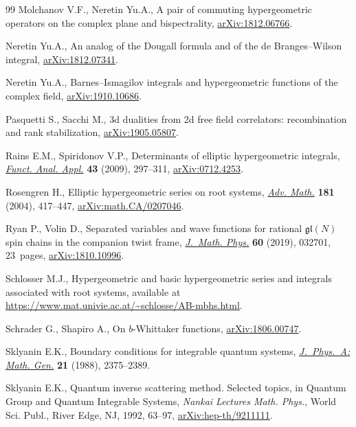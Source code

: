 \documentclass[pdftex]{sigma}
\numberwithin{equation}{section}
\begin{document}
\begin{thebibliography}{99}
Molchanov V.F., Neretin Yu.A., A pair of commuting hypergeometric operators on
 the complex plane and bispectrality, \href{https://arxiv.org/abs/1812.06766}{arXiv:1812.06766}.

Neretin Yu.A., An analog of the {D}ougall formula and of the de
 {B}ranges--{W}ilson integral, \href{https://arxiv.org/abs/1812.07341}{arXiv:1812.07341}.

Neretin Yu.A., Barnes--{I}smagilov integrals and hypergeometric functions of the
 complex field, \href{https://arxiv.org/abs/1910.10686}{arXiv:1910.10686}.

Pasquetti S., Sacchi M., 3d dualities from 2d free field correlators:
 recombination and rank stabilization, \href{https://arxiv.org/abs/1905.05807}{arXiv:1905.05807}.

Rains E.M., Spiridonov V.P., Determinants of elliptic hypergeometric integrals,
 \href{https://doi.org/10.1007/s10688-009-0037-7}{\textit{Funct. Anal. Appl.}} \textbf{43} (2009), 297--311, \href{https://arxiv.org/abs/0712.4253}{arXiv:0712.4253}.

Rosengren H., Elliptic hypergeometric series on root systems, \href{https://doi.org/10.1016/S0001-8708(03)00071-9}{\textit{Adv.
 Math.}} \textbf{181} (2004), 417--447, \href{https://arxiv.org/abs/math.CA/0207046}{arXiv:math.CA/0207046}.

Ryan P., Volin D., Separated variables and wave functions for rational
 {$\mathfrak{gl}(N)$} spin chains in the companion twist frame,
 \href{https://doi.org/10.1063/1.5085387}{\textit{J.~Math. Phys.}} \textbf{60} (2019), 032701, 23~pages,
 \href{https://arxiv.org/abs/1810.10996}{arXiv:1810.10996}.

Schlosser M.J., Hypergeometric and basic hypergeometric series and integrals
 associated with root systems, available at
 \url{https://www.mat.univie.ac.at/~schlosse/AB-mbhs.html}.

Schrader G., Shapiro A., On $b$-{W}hittaker functions, \href{https://arxiv.org/abs/1806.00747}{arXiv:1806.00747}.

Sklyanin E.K., Boundary conditions for integrable quantum systems,
 \href{https://doi.org/10.1088/0305-4470/21/10/015}{\textit{J.~Phys.~A: Math. Gen.}} \textbf{21} (1988), 2375--2389.

Sklyanin E.K., Quantum inverse scattering method. {S}elected topics, in Quantum
 Group and Quantum Integrable Systems, \textit{Nankai Lectures Math. Phys.}, World Sci.
 Publ., River Edge, NJ, 1992, 63--97, \mbox{\href{https://arxiv.org/abs/hep-th/9211111}{arXiv:hep-th/9211111}}.


\end{thebibliography}
\end{document}
